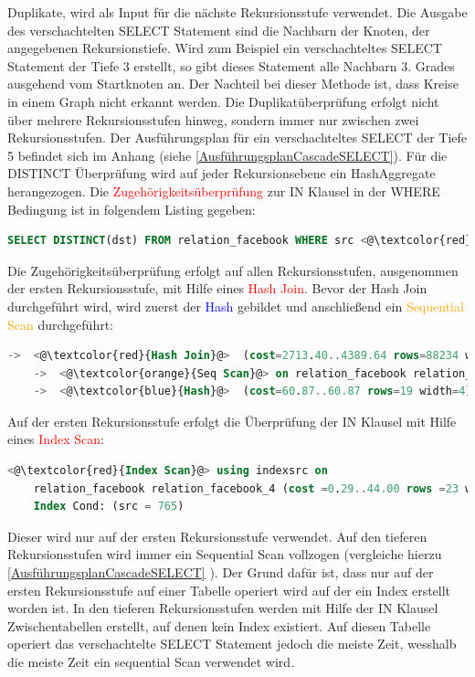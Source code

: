 Duplikate, wird als Input für die nächste Rekursionsstufe verwendet.
Die Ausgabe des verschachtelten SELECT Statement sind die Nachbarn der Knoten, der angegebenen Rekursionstiefe. Wird zum Beispiel ein
verschachteltes SELECT Statement der Tiefe 3 erstellt, so gibt dieses Statement alle Nachbarn 3. Grades ausgehend vom Startknoten an. Der Nachteil bei dieser Methode ist, dass
Kreise in einem Graph nicht erkannt werden. Die Duplikatüberprüfung erfolgt nicht über mehrere Rekursionsstufen hinweg, sondern immer nur zwischen zwei Rekursionsstufen.
Der Ausführungsplan für ein verschachteltes SELECT der Tiefe 5 befindet sich im Anhang (siehe \ref{AusführungsplanCascadeSELECT}). Für die DISTINCT Überprüfung
wird auf jeder Rekursionsebene ein HashAggregate herangezogen. Die \textcolor{red}{Zugehörigkeitsüberprüfung} zur IN Klausel in der WHERE Bedingung ist in folgendem
Listing gegeben:
\begin{lstlisting}[language=SQL,caption = IN Klausel,frame=single, label={INKlauselFacebook} ]
    SELECT DISTINCT(dst) FROM relation_facebook WHERE src <@\textcolor{red}{IN}@> ()
\end{lstlisting}
Die Zugehörigkeitsüberprüfung erfolgt auf allen Rekursionsstufen, ausgenommen der ersten Rekursionsstufe, mit Hilfe eines \textcolor{red}{Hash Join}. Bevor der Hash Join
durchgeführt wird, wird zuerst der \textcolor{blue}{Hash} gebildet und anschließend ein \textcolor{orange}{Sequential Scan} durchgeführt:
\begin{lstlisting}[language=SQL,caption = Aufruf der DISTINCT Funktion,frame=single, label={WhereConditionCTE} ]
    ->  <@\textcolor{red}{Hash Join}@>  (cost=2713.40..4389.64 rows=88234 width=4) (actual time=11.821..17.797 rows=1709 loops=1)
    ->  <@\textcolor{orange}{Seq Scan}@> on relation_facebook relation_facebook_1  (cost=10000000000.00..10000001649.62 rows=100762 width=8) (actual time=0.004..4.822 rows=100762 loops=1)
    ->  <@\textcolor{blue}{Hash}@>  (cost=60.87..60.87 rows=19 width=4) (actual time=0.022..0.022 rows=4 loops=1)
\end{lstlisting}
Auf der ersten Rekursionsstufe erfolgt die Überprüfung der IN Klausel mit Hilfe eines \textcolor{red}{Index Scan}:
\begin{lstlisting}[language=SQL,caption = IndexScanFacebookRelation,frame=single, label={indexScanFacebookRelation} ]
    <@\textcolor{red}{Index Scan}@> using indexsrc on
    relation_facebook relation_facebook_4 (cost =0.29..44.00 rows =23 width =4) ( actual time =0.009..0.012 rows =27 loops =1)
    Index Cond: (src = 765)
\end{lstlisting}
Dieser wird nur auf der ersten Rekursionsstufe verwendet. Auf den tieferen Rekursionsstufen wird immer ein Sequential Scan vollzogen (vergleiche hierzu \ref{AusführungsplanCascadeSELECT} ). Der Grund dafür ist, dass nur auf der ersten Rekursionsstufe auf
einer Tabelle operiert wird auf der ein Index erstellt worden ist. In den tieferen Rekursionsstufen werden mit Hilfe der IN Klausel Zwischentabellen erstellt, auf denen kein Index existiert.
 Auf diesen Tabelle operiert das verschachtelte SELECT Statement jedoch die meiste Zeit, wesshalb die meiste Zeit ein sequential Scan verwendet wird.
